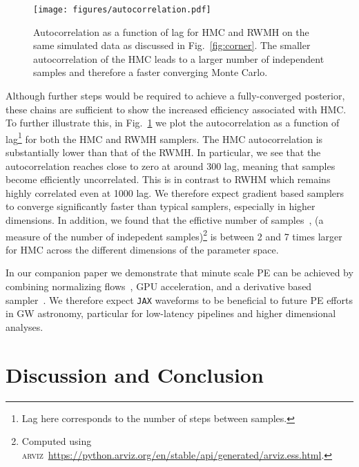 \documentclass[twocolumn]{aastex631}
\newcommand{\jax}{\texttt{JAX}\xspace}
\begin{document}
\begin{figure}[t]
	\begin{centering}
		\texttt{[image: figures/autocorrelation.pdf]}
		\caption{
			Autocorrelation as a function of lag for HMC and RWMH on the same simulated data as discussed in Fig.~\ref{fig:corner}.
            The smaller autocorrelation of the HMC leads to a larger number of independent samples and therefore a faster converging Monte Carlo.
		}
		\label{fig:autocorrelation}
	\end{centering}
\end{figure}

Although further steps would be required to achieve a fully-converged posterior, these chains are sufficient to show the increased efficiency associated with HMC. 
To further illustrate this, in Fig.~\ref{fig:autocorrelation} we plot the autocorrelation as a function of lag\footnote{
    Lag here corresponds to the number of steps between samples.
} for both the HMC and RWMH samplers.
The HMC autocorrelation is substantially lower than that of the RWMH.
In particular, we see that the autocorrelation reaches close to zero at around 300 lag, meaning that samples become efficiently uncorrelated. This is in contrast to RWHM which remains highly correlated even at 1000 lag.
We therefore expect gradient based samplers to converge significantly faster than typical samplers, especially in higher dimensions.
In addition, we found that the effictive number of samples~\citep{arviz_2019}, (a measure of the number of indepedent samples)\footnote{
    Computed using \textsc{arviz}~\url{https://python.arviz.org/en/stable/api/generated/arviz.ess.html}.
    }
is between 2 and 7 times larger for HMC across the different dimensions of the parameter space.

In our companion paper we demonstrate that minute scale PE can be achieved by combining normalizing flows~\citep{2022arXiv221106397W, Gabrie:2021tlu}, GPU acceleration, and a derivative based sampler~\citep{PEpaper}. 
We therefore expect \jax waveforms to be beneficial to future PE efforts in GW astronomy, particular for low-latency pipelines and higher dimensional analyses.

\section{Discussion and Conclusion}
\label{subsec:discussion}
\end{document}
